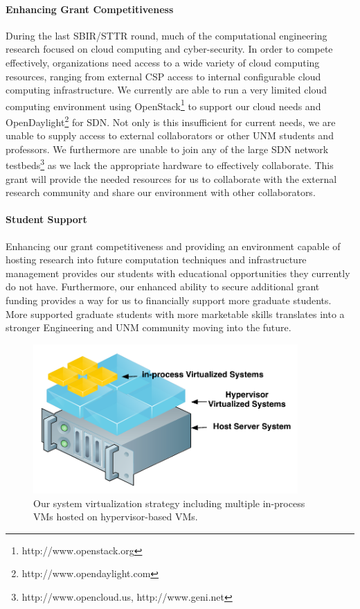 \documentclass[12pt,letterpaper]{article}
\begin{document}
\paragraph{Enhancing Grant Competitiveness} During the last SBIR/STTR round, much of the computational engineering research focused on cloud computing and cyber-security. In order to compete effectively, organizations need access to a wide variety of cloud computing resources, ranging from external CSP access to internal configurable cloud computing infrastructure. We currently are able to run a very limited cloud computing environment using OpenStack\footnote{http://www.openstack.org} to support our cloud needs and OpenDaylight\footnote{http://www.opendaylight.com} for SDN. Not only is this insufficient for current needs, we are unable to supply access to external collaborators or other UNM students and professors. We furthermore are unable to join any of the large SDN network testbeds\footnote{http://www.opencloud.us, http://www.geni.net} as we lack the appropriate hardware to effectively collaborate. This grant will provide the needed resources for us to collaborate with the external research community and share our environment with other collaborators.

\paragraph{Student Support} Enhancing our grant competitiveness and providing an environment capable of hosting research into future computation techniques and infrastructure management provides our students with educational opportunities they currently do not have. Furthermore, our enhanced ability to secure additional grant funding provides a way for us to financially support more graduate students. More supported graduate students with more marketable skills translates into a stronger Engineering and UNM community moving into the future.

\begin{figure}[!t]
\centering
\includegraphics[width=0.9\textwidth]{images/virtualization.pdf}
\caption{Our system virtualization strategy including multiple in-process VMs hosted on hypervisor-based VMs.}
\label{fig:virtual}
\end{figure}
\end{document}

